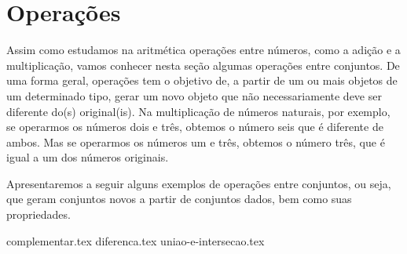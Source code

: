 \section{Operações}
\label{sec:op}
Assim como estudamos na aritmética operações entre números, como a adição e a multiplicação, vamos conhecer nesta seção algumas operações entre conjuntos. De uma forma geral, operações tem o objetivo de, a partir de um ou mais objetos de um determinado tipo, gerar um novo objeto que não necessariamente deve ser diferente do(s) original(is). Na multiplicação de números naturais, por exemplo, se operarmos os números dois e três, obtemos o número seis que é diferente de ambos. Mas se operarmos os números um e três, obtemos o número três, que é igual a um dos números originais.

Apresentaremos a seguir alguns exemplos de operações entre conjuntos, ou seja, que geram conjuntos novos a partir de conjuntos dados, bem como suas propriedades.

{complementar.tex}
{diferenca.tex}
{uniao-e-intersecao.tex}

